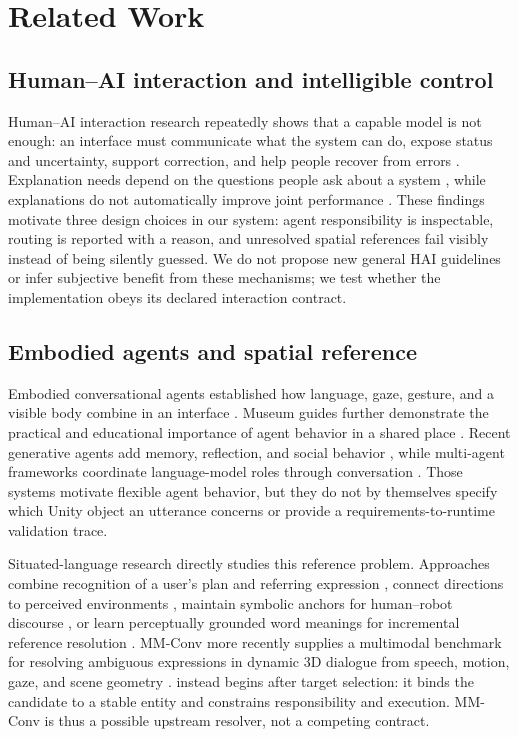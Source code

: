 \section{Related Work}
\label{sec:related-work}

\subsection{Human--AI interaction and intelligible control}

Human--AI interaction research repeatedly shows that a capable model is not
enough: an interface must communicate what the system can do, expose status and
uncertainty, support correction, and help people recover from errors
\cite{amershi2019guidelines,yang2020reexamining,weisz2024design}. Explanation
needs depend on the questions people ask about a system
\cite{liao2020questioning}, while explanations do not automatically improve
joint performance \cite{bansal2021whole}. These findings motivate three design
choices in our system: agent responsibility is inspectable, routing is reported
with a reason, and unresolved spatial references fail visibly instead of being
silently guessed. We do not propose new general HAI guidelines or infer
subjective benefit from these mechanisms; we test whether the implementation
obeys its declared interaction contract.

\subsection{Embodied agents and spatial reference}

Embodied conversational agents established how language, gaze, gesture, and a
visible body combine in an interface \cite{cassell1999embodiment}. Museum
guides further demonstrate the practical and educational importance of agent
behavior in a shared place \cite{kopp2005museum,bickmore2011museum}. Recent
generative agents add memory, reflection, and social behavior
\cite{park2023generative}, while multi-agent frameworks coordinate
language-model roles through conversation \cite{li2023camel}. Those systems
motivate flexible agent behavior, but they do not by themselves specify which
Unity object an utterance concerns or provide a requirements-to-runtime
validation trace.

Situated-language research directly studies this reference problem. Approaches
combine recognition of a user's plan and referring expression
\cite{gorniak2005grounding}, connect directions to perceived environments
\cite{kollar2010directions}, maintain symbolic anchors for human--robot
discourse \cite{lemaignan2012grounding}, or learn perceptually grounded word
meanings for incremental reference resolution
\cite{kennington2015reference}. MM-Conv more recently supplies a multimodal
benchmark for resolving ambiguous expressions in dynamic 3D dialogue from
speech, motion, gaze, and scene geometry \cite{deichler2026mmconv}.
\systemname{} instead begins after target selection: it binds the candidate to
a stable entity and constrains responsibility and execution. MM-Conv is thus a
possible upstream resolver, not a competing contract.

